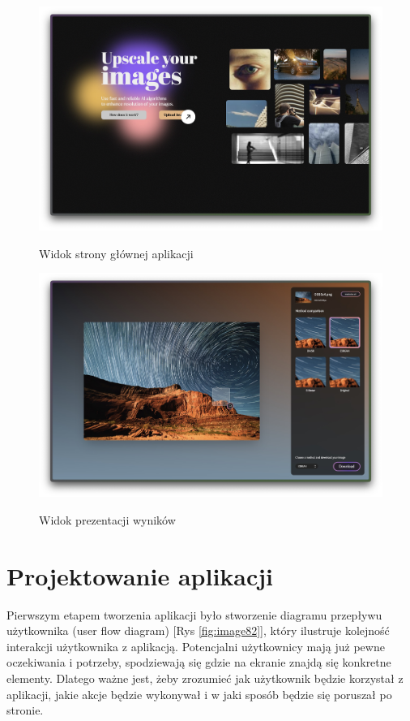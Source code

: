 \newpage
\begin{figure}[H]
    \begin{minipage}{\linewidth}
        \centering
        \includegraphics[width=\linewidth]{Rozdziały/06.Aplikacja/Obrazy/kursor-link.jpg}  
        \caption{Widok strony głównej aplikacji}
        \label{fig:image80}
        \hspace{2cm}
        \includegraphics[width=\linewidth]{Rozdziały/06.Aplikacja/Obrazy/display5.jpg}  
        \caption{Widok prezentacji wyników}
        \label{fig:image81}
    \end{minipage}
\end{figure}
\newpage

\section{Projektowanie aplikacji}

Pierwszym etapem tworzenia aplikacji było stworzenie diagramu przepływu użytkownika (user flow diagram) [Rys \ref{fig:image82}], który ilustruje kolejność interakcji użytkownika z aplikacją. Potencjalni użytkownicy mają już pewne oczekiwania i potrzeby, spodziewają się gdzie na ekranie znajdą się konkretne elementy. Dlatego ważne jest, żeby zrozumieć jak użytkownik będzie korzystał z aplikacji, jakie akcje będzie wykonywał i w jaki sposób będzie się poruszał po stronie.

